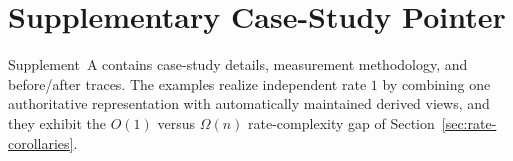\section{Supplementary Case-Study Pointer}\label{sec:empirical}

Supplement~A contains case-study details, measurement methodology, and before/after traces. The examples realize independent rate $1$ by combining one authoritative representation with automatically maintained derived views, and they exhibit the $O(1)$ versus $\Omega(n)$ rate-complexity gap of Section~\ref{sec:rate-corollaries}.

